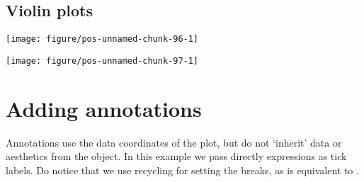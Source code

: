 \documentclass[paper=a4,10pt,div=17,headsepline,BCOR=12mm,twoside,open=right]{scrbook}\usepackage{knitr}
\begin{document}
\subsection{Violin plots}

\begin{knitrout}\footnotesize
{}\color{fgcolor}\begin{kframe}
\begin{alltt}
  \hlopt{+}
  \hlstd{()}
\end{alltt}
\end{kframe}

{\centering \texttt{[image: figure/pos-unnamed-chunk-96-1]} 

}



\end{knitrout}

\begin{knitrout}\footnotesize
{}\color{fgcolor}\begin{kframe}
\begin{alltt}
    \hlopt{+}
  \hlstd{(} \hlstd{=} \hlstd{)} \hlopt{+}
  \hlstd{(} \hlstd{=} \hlstd{,}  \hlstd{=} \hlstd{(}\hlstd{),}
              \hlstd{=} \hlstd{,}  \hlstd{=} \hlstd{)}
\end{alltt}
\end{kframe}

{\centering \texttt{[image: figure/pos-unnamed-chunk-97-1]} 

}



\end{knitrout}

\section{Adding annotations}

Annotations use the data coordinates of the plot, but do not `inherit' data or aesthetics from the  object. In this example we pass directly expressions as tick labels. Do notice that we use recycling for setting the breaks, as  is equivalent to .
\end{document}
